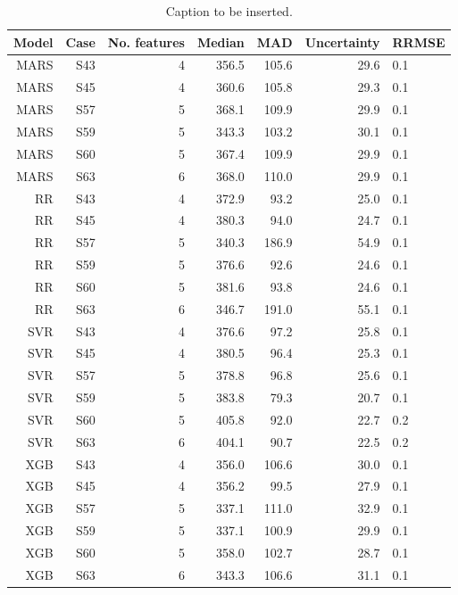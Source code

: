 \begin{table}
\centering
\caption{Caption to be inserted.}
\label{uncertainty_table__mc}
\begin{tabular}{rrrrrr}
\toprule
Model & Case &  No. features &  Median &   MAD &  Uncertainty &  RRMSE \\
\midrule
 MARS &  S43 &             4 &   356.5 & 105.6 &         29.6 &    0.1 \\
 MARS &  S45 &             4 &   360.6 & 105.8 &         29.3 &    0.1 \\
 MARS &  S57 &             5 &   368.1 & 109.9 &         29.9 &    0.1 \\
 MARS &  S59 &             5 &   343.3 & 103.2 &         30.1 &    0.1 \\
 MARS &  S60 &             5 &   367.4 & 109.9 &         29.9 &    0.1 \\
 MARS &  S63 &             6 &   368.0 & 110.0 &         29.9 &    0.1 \\
   RR &  S43 &             4 &   372.9 &  93.2 &         25.0 &    0.1 \\
   RR &  S45 &             4 &   380.3 &  94.0 &         24.7 &    0.1 \\
   RR &  S57 &             5 &   340.3 & 186.9 &         54.9 &    0.1 \\
   RR &  S59 &             5 &   376.6 &  92.6 &         24.6 &    0.1 \\
   RR &  S60 &             5 &   381.6 &  93.8 &         24.6 &    0.1 \\
   RR &  S63 &             6 &   346.7 & 191.0 &         55.1 &    0.1 \\
  SVR &  S43 &             4 &   376.6 &  97.2 &         25.8 &    0.1 \\
  SVR &  S45 &             4 &   380.5 &  96.4 &         25.3 &    0.1 \\
  SVR &  S57 &             5 &   378.8 &  96.8 &         25.6 &    0.1 \\
  SVR &  S59 &             5 &   383.8 &  79.3 &         20.7 &    0.1 \\
  SVR &  S60 &             5 &   405.8 &  92.0 &         22.7 &    0.2 \\
  SVR &  S63 &             6 &   404.1 &  90.7 &         22.5 &    0.2 \\
  XGB &  S43 &             4 &   356.0 & 106.6 &         30.0 &    0.1 \\
  XGB &  S45 &             4 &   356.2 &  99.5 &         27.9 &    0.1 \\
  XGB &  S57 &             5 &   337.1 & 111.0 &         32.9 &    0.1 \\
  XGB &  S59 &             5 &   337.1 & 100.9 &         29.9 &    0.1 \\
  XGB &  S60 &             5 &   358.0 & 102.7 &         28.7 &    0.1 \\
  XGB &  S63 &             6 &   343.3 & 106.6 &         31.1 &    0.1 \\
\bottomrule
\end{tabular}
\end{table}
